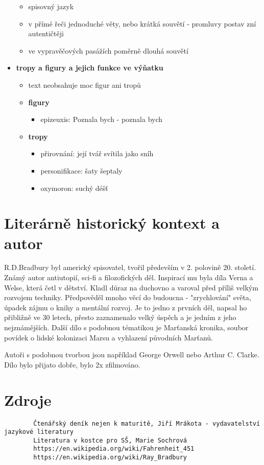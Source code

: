 \documentclass[11pt]{article}
\begin{document}
\begin{itemize}
        \begin{itemize}
            \item spisovný jazyk
            \item v přímé řeči jednoduché věty, nebo krátká souvětí - promluvy postav zní autentičtěji
            \item ve vypravěčových pasážích poměrně dlouhá souvětí
        \end{itemize}
        \item\textbf{tropy a figury a jejich funkce ve výňatku}
        \begin{itemize}
            \item text neobsahuje moc figur ani tropů
            \item\textbf{figury}
            \begin{itemize}
                \item epizeuxis: Poznala bych - poznala bych
            \end{itemize}
            \item\textbf{tropy}
            \begin{itemize}
                \item přirovnání: její tvář svítila jako sníh
                \item personifikace: šaty šeptaly
                \item oxymoron: suchý déšť
            \end{itemize}
        \end{itemize}
    \end{itemize}
    \section*{Literárně historický kontext a autor}
    R.D.Bradbury byl americký spisovatel, tvořil především v 2. polovině 20. století.
    Známý autor antiutopií, sci-fi a filozofických děl.
    Inspirací mu byla díla Verna a Welse, která četl v dětství.
    Kladl důraz na duchovno a varoval před příliš velkým rozvojem techniky.
    Předpověděl mnoho věcí do budoucna - "zrychlování" světa, úpadek zájmu o knihy a mentální rozvoj.
    Je to jedno z prvních děl, napsal ho přibližně ve 30 letech, přesto zaznamenalo velký úspěch a je jedním z jeho nejznámějších.
    Další dílo s podobnou tématikou je Marťanská kronika, soubor povídek o lidské kolonizaci Marsu a vyhlazení původních Marťanů.

    Autoři s podobnou tvorbou jsou například George Orwell nebo Arthur C. Clarke.
    Dílo bylo přijato dobře, bylo 2x zfilmováno.
    \section*{Zdroje}
    \begin{verbatim}
        Čtenářský deník nejen k maturitě, Jiří Mrákota - vydavatelství jazykové literatury
        Literatura v kostce pro SŠ, Marie Sochrová
        https://en.wikipedia.org/wiki/Fahrenheit_451
        https://en.wikipedia.org/wiki/Ray_Bradbury
    \end{verbatim}
    
\end{document}
